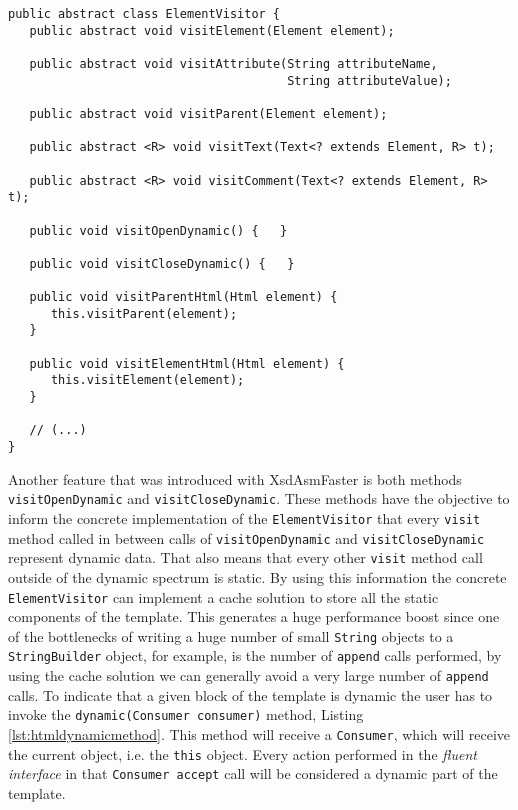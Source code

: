 \bigskip


\begin{minipage}{\linewidth}
\begin{lstlisting}[caption={ElementVisitor Generated by XsdAsmFaster},label={lst:elementvisitorxsdasmfaster}]
public abstract class ElementVisitor {
   public abstract void visitElement(Element element);

   public abstract void visitAttribute(String attributeName, 
                                       String attributeValue);

   public abstract void visitParent(Element element);

   public abstract <R> void visitText(Text<? extends Element, R> t);

   public abstract <R> void visitComment(Text<? extends Element, R> t);

   public void visitOpenDynamic() {   }

   public void visitCloseDynamic() {   }

   public void visitParentHtml(Html element) {
      this.visitParent(element);
   }
   
   public void visitElementHtml(Html element) {
      this.visitElement(element);
   }
   
   // (...)
}
\end{lstlisting}
\end{minipage}

\noindent
Another feature that was introduced with XsdAsmFaster is both methods \texttt{visitOpenDynamic} and \texttt{visitCloseDynamic}. These methods have the objective to inform the concrete implementation of the \texttt{ElementVisitor} that every \texttt{visit} method called in between calls of \texttt{visitOpenDynamic} and \texttt{visitCloseDynamic} represent dynamic data. That also means that every other \texttt{visit} method call outside of the dynamic spectrum is static. By using this information the concrete \texttt{ElementVisitor} can implement a cache solution to store all the static components of the template. This generates a huge performance boost since one of the bottlenecks of writing a huge number of small \texttt{String} objects to a \texttt{StringBuilder} object, for example, is the number of \texttt{append} calls performed, by using the cache solution we can generally avoid a very large number of \texttt{append} calls. To indicate that a given block of the template is dynamic the user has to invoke the \texttt{dynamic(Consumer consumer)} method, Listing \ref{lst:htmldynamicmethod}. This method will receive a \texttt{Consumer}, which will receive the current object, i.e. the \texttt{this} object. Every action performed in the \textit{fluent interface} in that \texttt{Consumer accept} call will be considered a dynamic part of the template.


